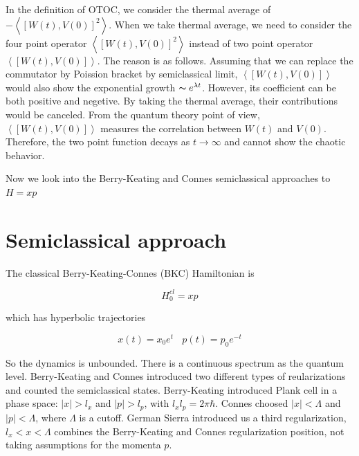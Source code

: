 \documentclass[12pt]{report}
\newcommand*{\1}{\hspace{1pt}}
\begin{document}
    In the definition of OTOC, we consider the thermal average of \\ $- \left\langle\left[W(t),V(0)\right]^{2}\right\rangle$. When we take thermal average, we need to 
    consider the four point operator $\left\langle\left[W(t),V(0)\right]^{2}\right\rangle$ instead of two point operator \\ $\left\langle\left[W(t),V(0)\right]\right\rangle$.
    The reason is as follows. Assuming that we can replace the commutator by Poission bracket by semiclassical limit, $\left\langle\left[W(t),V(0)\right]\right\rangle$
    would also show the exponential growth $\thicksim  e^{\lambda t}$. However, its coefficient can be both positive and negetive. By taking the thermal average, their
    contributions would be canceled. From the quantum theory point of view, $\left\langle\left[W(t),V(0)\right]\right\rangle$ measures the correlation between $W(t)$
    and $V(0)$. Therefore, the two point function decays as $t \rightarrow \infty$ and cannot show the chaotic behavior.

    Now we look into the Berry-Keating and Connes semiclassical approaches to $H=xp$

    \newpage
    \chapter{Semiclassical approach}

    The classical Berry-Keating-Connes (BKC) Hamiltonian is\cite{s1,s2}

    \begin{equation}
        H ^{cl} _{0} = xp
    \end{equation}

    which has hyperbolic trajectories 
    
    \begin{equation}
        x(t) = x_{0}e^{t}  \ \ \ \  p(t) = p_{0}e^{-t}
    \end{equation}

    So the dynamics is unbounded. There is a continuous spectrum as the quantum level. Berry-Keating and Connes introduced two different types of reularizations and counted
    the semiclassical states. Berry-Keating introduced Plank cell in a phase space: $|x| > l_{x}$ and $|p| > l_{p}$, with $l_{x}l_{p} = 2 \pi \hbar$. Connes 
    choosed $|x| < \Lambda $ and $|p| < \Lambda$, where $\Lambda$ is a cutoff. German Sierra introduced us a third regularization, $l_{x} < x < \Lambda$ combines
    the Berry-Keating and Connes regularization position, not taking assumptions for the momenta $p$. \
\end{document}
